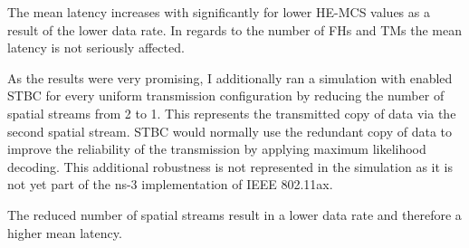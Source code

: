 The mean latency increases with significantly for lower \ac{HE}-\ac{MCS} values as a result of the lower data rate.
In regards to the number of \ac{FH}s and \ac{TM}s the mean latency is not seriously affected.

As the results were very promising, I additionally ran a simulation with enabled \ac{STBC} for every uniform transmission configuration
by reducing the number of spatial streams from \num{2} to \num{1}.
This represents the transmitted copy of data via the second spatial stream.
\ac{STBC} would normally use the redundant copy of data to improve the reliability of the transmission by applying maximum likelihood decoding.
This additional robustness is not represented in the simulation as it is not yet part of the ns-3 implementation of IEEE 802.11ax.

The reduced number of spatial streams result in a lower data rate and therefore a higher mean latency.






